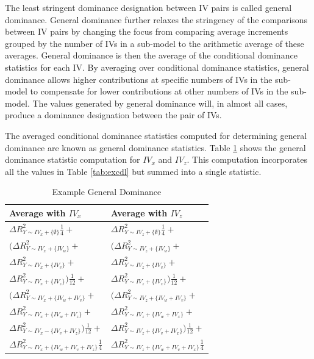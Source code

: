 \documentclass[man]{apa7}
\begin{document}
	The least stringent dominance designation between IV pairs is called general dominance.
	General dominance further relaxes the stringency of the comparisons between IV pairs by changing the focus from comparing average increments grouped by the number of IVs in a sub-model to the arithmetic average of these averages.
	General dominance is then the average of the conditional dominance statistics for each IV.
	By averaging over conditional dominance statistics, general dominance allows higher contributions at specific numbers of IVs in the sub-model to compensate for lower contributions at other numbers of IVs in the sub-model. 
	The values generated by general dominance will, in almost all cases, produce a dominance designation between the pair of IVs.
	
	The averaged conditional dominance statistics computed for determining general dominance are known as general dominance statistics. 
	Table \ref{tab:exgen} shows the general dominance statistic computation for $IV_x$ and $IV_z$.
	This computation incorporates all the values in Table \ref{tab:excdl} but summed into a single statistic.
	
		\begin{table}[h!]
		\centering
		\caption{\centering Example General Dominance}
		\begin{tabular}{ l l }
			Average with $IV_x$ & Average with $IV_z$ \\
			\hline
			$\Delta R^2_{Y \sim IV_x + \{\emptyset\}}\frac{1}{4} + $ & $\Delta R^2_{Y \sim IV_z + \{\emptyset\}}\frac{1}{4} +$ \\
			$(\Delta R^2_{Y \sim IV_x + \{IV_w\}} + $ & $(\Delta R^2_{Y \sim IV_z + \{IV_w\}} + $ \\
			$\Delta R^2_{Y \sim IV_x + \{IV_v\}} + $ & $\Delta R^2_{Y \sim IV_z + \{IV_v\}} + $ \\
			$\Delta R^2_{Y \sim IV_x + \{IV_z\}})\frac{1}{12} + $ & $\Delta R^2_{Y \sim IV_z + \{IV_x\}})\frac{1}{12} + $ \\
			$(\Delta R^2_{Y \sim IV_x + \{IV_w + IV_v\}} + $ & $(\Delta R^2_{Y \sim IV_z + \{IV_w + IV_v\}} + $ \\
			$\Delta R^2_{Y \sim IV_x + \{IV_w + IV_z\}} + $ & $\Delta R^2_{Y \sim IV_z + \{IV_w + IV_x\}} + $ \\
			$\Delta R^2_{Y \sim IV_x - \{IV_v + IV_z\}})\frac{1}{12} + $ & $\Delta R^2_{Y \sim IV_z + \{IV_v + IV_x\}})\frac{1}{12} +$ \\
			$\Delta R^2_{Y \sim IV_x + \{IV_w + IV_v + IV_z\}}\frac{1}{4}$ & $\Delta R^2_{Y \sim IV_z + \{IV_w + IV_v + IV_x\}}\frac{1}{4}$ \\
			\hline
		\end{tabular}
		\label{tab:exgen}
	\end{table}
\end{document}
